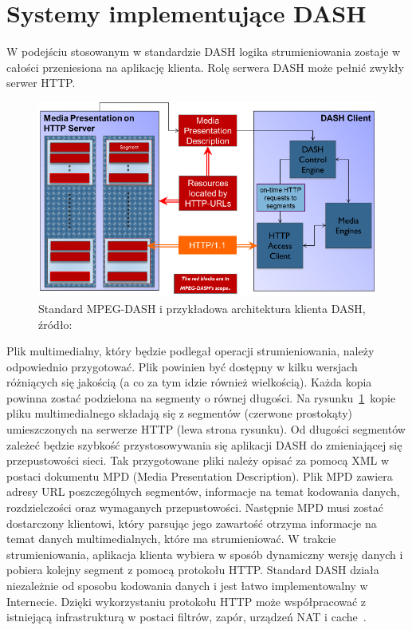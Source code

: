 \section{Systemy implementujące DASH}
W podejściu stosowanym w standardzie DASH logika strumieniowania zostaje w całości przeniesiona na aplikację klienta. Rolę serwera DASH może pełnić zwykły serwer HTTP.
\label{sec:dash-arch}
\begin{figure}[h!]
	\centering
		\includegraphics{dash}
	\caption{Standard MPEG-DASH i przykładowa architektura klienta DASH, źródło:~\cite{DASH}}
	\label{fig:dash}
\end{figure}
 Plik multimedialny, który będzie podlegał operacji strumieniowania, należy odpowiednio przygotować. Plik powinien być dostępny w kilku wersjach różniących się jakością (a co za tym idzie również wielkością).  Każda kopia powinna zostać podzielona na segmenty o równej długości. Na rysunku~\ref{fig:dash}~kopie pliku multimedialnego składają się z segmentów (czerwone prostokąty) umieszczonych na serwerze HTTP (lewa strona rysunku). Od długości segmentów zależeć będzie szybkość przystosowywania się aplikacji DASH do zmieniającej się przepustowości sieci. Tak przygotowane pliki należy opisać za pomocą XML w postaci dokumentu MPD (Media Presentation Description). Plik MPD zawiera adresy URL poszczególnych segmentów, informacje na temat kodowania danych, rozdzielczości oraz wymaganych przepustowości. Następnie MPD musi zostać dostarczony klientowi, który parsując jego zawartość otrzyma informacje na temat danych multimedialnych, które ma strumieniować. W trakcie strumieniowania, aplikacja klienta wybiera w sposób dynamiczny wersję danych i pobiera kolejny segment z pomocą protokołu HTTP. 
Standard DASH działa niezależnie od sposobu kodowania danych i jest łatwo implementowalny w Internecie. Dzięki wykorzystaniu protokołu HTTP może współpracować z istniejącą infrastrukturą w postaci filtrów, zapór, urządzeń NAT i cache~\cite{DASH}.

